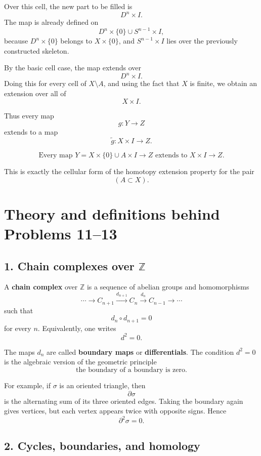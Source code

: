 \documentclass[12pt,a4paper]{article}
\theoremstyle{notespace}
\begin{document}
Over this cell, the new part to be filled is
\[
D^n\times I.
\]
The map is already defined on
\[
D^n\times\{0\}\cup S^{n-1}\times I,
\]
because \(D^n\times\{0\}\) belongs to \(X\times\{0\}\), and \(S^{n-1}\times I\) lies over the previously constructed skeleton.

By the basic cell case, the map extends over
\[
D^n\times I.
\]
Doing this for every cell of \(X\setminus A\), and using the fact that \(X\) is finite, we obtain an extension over all of
\[
X\times I.
\]

Thus every map
\[
g:Y\longrightarrow Z
\]
extends to a map
\[
\widetilde g:X\times I\longrightarrow Z.
\]

\[
\boxed{
	\text{Every map }Y=X\times\{0\}\cup A\times I\to Z
	\text{ extends to }X\times I\to Z.
}
\]

This is exactly the cellular form of the homotopy extension property for the pair
\[
(A\subset X).
\]

\section{Theory and definitions behind Problems 11--13}

\subsection*{1. Chain complexes over \(\mathbb Z\)}

A \textbf{chain complex} over \(\mathbb Z\) is a sequence of abelian groups and homomorphisms
\[
\cdots
\longrightarrow C_{n+1}
\xrightarrow{d_{n+1}}
C_n
\xrightarrow{d_n}
C_{n-1}
\longrightarrow \cdots
\]
such that
\[
d_n\circ d_{n+1}=0
\]
for every \(n\). Equivalently, one writes
\[
d^2=0.
\]

The maps \(d_n\) are called \textbf{boundary maps} or \textbf{differentials}. The condition \(d^2=0\) is the algebraic version of the geometric principle
\[
\text{the boundary of a boundary is zero.}
\]

For example, if \(\sigma\) is an oriented triangle, then
\[
\partial \sigma
\]
is the alternating sum of its three oriented edges. Taking the boundary again gives vertices, but each vertex appears twice with opposite signs. Hence
\[
\partial^2\sigma=0.
\]

\subsection*{2. Cycles, boundaries, and homology}
\end{document}
